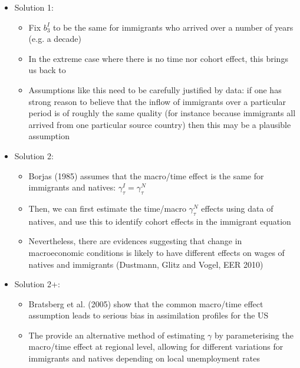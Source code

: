             \begin{itemize}
                \item Solution 1: 
                    \begin{itemize}
                        \item Fix $b_{3}^I$ to be the same for immigrants who arrived over a number of years (e.g. a decade)
                        \item In the extreme case where there is no time nor cohort effect, this brings us back to \cite{chiswick_effect_1978}
                        \item Assumptions like this need to be carefully justified by data: if one has strong reason to believe that the inflow of immigrants over a particular period is of roughly the same quality (for instance because immigrants all arrived from one particular source country) then this may be a plausible assumption
                    \end{itemize}
                \item Solution 2: 
                    \begin{itemize}
                        \item Borjas (1985) assumes that the macro/time effect is the same for immigrants and natives: $\gamma_{\tau}^I=\gamma_{\tau}^N$
                        \item Then, we can first estimate the time/macro $\gamma_{\tau}^N$ effects using data of natives, and use this to identify cohort effects in the immigrant equation
                        \item Nevertheless, there are evidences suggesting that change in macroeconomic conditions is likely to have different effects on wages of natives and immigrants (Dustmann, Glitz and Vogel, EER 2010)
                    \end{itemize}
                \item Solution 2+: 
                    \begin{itemize}
                        \item Bratsberg et al. (2005) show that the common macro/time effect assumption leads to serious bias in assimilation profiles for the US
                        \item The provide an alternative method of estimating $\gamma$ by parameterising the macro/time effect at regional level, allowing for different variations for immigrants and natives depending on local unemployment rates
                    \end{itemize}
            \end{itemize}

